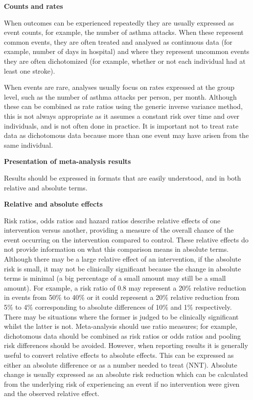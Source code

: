 \documentclass[
  10pt,
  a4paper,
  DIV=11,
  numbers=noendperiod]{scrreprt}
\begin{document}
\textbf{Counts and rates}

When outcomes can be experienced repeatedly they are usually expressed
as event counts, for example, the number of asthma attacks. When these
represent common events, they are often treated and analysed as
continuous data (for example, number of days in hospital) and where they
represent uncommon events they are often dichotomized (for example,
whether or not each individual had at least one stroke).

When events are rare, analyses usually focus on rates expressed at the
group level, such as the number of asthma attacks per person, per month.
Although these can be combined as rate ratios using the generic inverse
variance method, this is not always appropriate as it assumes a constant
risk over time and over individuals, and is not often done in practice.
It is important not to treat rate data as dichotomous data because more
than one event may have arisen from the same individual.

\textbf{Presentation of meta-analysis results}

Results should be expressed in formats that are easily understood, and
in both relative and absolute terms.

\textbf{Relative and absolute effects}

Risk ratios, odds ratios and hazard ratios describe relative effects of
one intervention versus another, providing a measure of the overall
chance of the event occurring on the intervention compared to control.
These relative effects do not provide information on what this
comparison means in absolute terms. Although there may be a large
relative effect of an intervention, if the absolute risk is small, it
may not be clinically significant because the change in absolute terms
is minimal (a big percentage of a small amount may still be a small
amount). For example, a risk ratio of 0.8 may represent a 20\% relative
reduction in events from 50\% to 40\% or it could represent a 20\%
relative reduction from 5\% to 4\% corresponding to absolute differences
of 10\% and 1\% respectively. There may be situations where the former
is judged to be clinically significant whilst the latter is not.
Meta-analysis should use ratio measures; for example, dichotomous data
should be combined as risk ratios or odds ratios and pooling risk
differences should be avoided. However, when reporting results it is
generally useful to convert relative effects to absolute effects. This
can be expressed as either an absolute difference or as a number needed
to treat (NNT). Absolute change is usually expressed as an absolute risk
reduction which can be calculated from the underlying risk of
experiencing an event if no intervention were given and the observed
relative effect.
\end{document}
